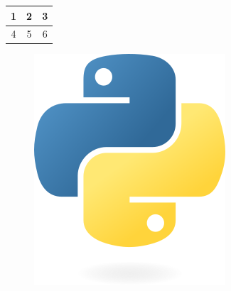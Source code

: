 \documentclass{article}
\begin{document}
        \begin{tabular}{c|c|c}
\hline
1 & 2 & 3 \\
\hline
4 & 5 & 6 \\
\hline
\end{tabular}
\begin{figure}
\includegraphics{artifacts/python_logo.png}
\end{figure}

    
\end{document}
